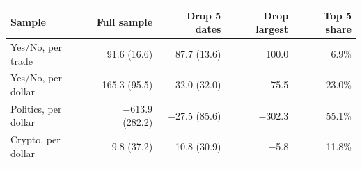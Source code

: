 \begin{tabular}{lrrrr}
\toprule
Sample & Full sample & Drop 5 dates & Drop largest & Top 5 share \\
\midrule
Yes/No, per trade & 91.6 (16.6) & 87.7 (13.6) & 100.0 & 6.9\% \\
Yes/No, per dollar & \ensuremath{-}165.3 (95.5) & \ensuremath{-}32.0 (32.0) & \ensuremath{-}75.5 & 23.0\% \\
Politics, per dollar & \ensuremath{-}613.9 (282.2) & \ensuremath{-}27.5 (85.6) & \ensuremath{-}302.3 & 55.1\% \\
Crypto, per dollar & 9.8 (37.2) & 10.8 (30.9) & \ensuremath{-}5.8 & 11.8\% \\
\bottomrule
\end{tabular}
